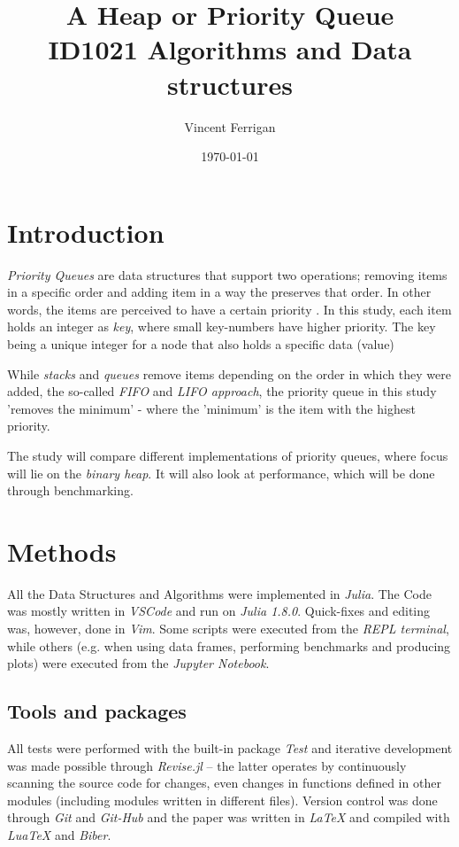\documentclass[a4paper, 11pt]{article}
\title{A Heap or Priority Queue\\ \small{ID1021 Algorithms and Data structures}} %
\author{Vincent Ferrigan}
\date{\today}
\begin{document}
    \maketitle
    \section*{Introduction}
    \emph{Priority Queues} are data structures that support two operations; removing items 
    in a specific order and adding item in a way the preserves that order. 
    In other words, 
    the items are perceived to have a certain priority \parencite{Segeqick2011Alg4th}.
    In this study, each item holds an integer as \emph{key}, 
    where small key-numbers have higher priority. 
    The key being a unique integer for a node that also holds a specific data (value)
    
    While \emph{stacks} and \emph{queues} remove items depending on the order in
    which they were added, the 
    so-called \emph{FIFO} and \emph{LIFO approach}, 
    the priority queue in this study 'removes the minimum' - where the 'minimum' is the
    item with the highest priority. 

    The study will compare different implementations of priority queues, 
    where focus will lie on the \emph{binary heap}. It will also look at performance,
    which will be done through benchmarking. 

    \section*{Methods}
    \label{sec:methods}
    All the Data Structures and Algorithms were implemented in \emph{Julia}.
    The Code was mostly written in \emph{VSCode} and run on \emph{Julia 1.8.0}.
    Quick-fixes and editing was, however, done in \emph{Vim}. 
    Some scripts were executed from the \emph{REPL terminal},  while others (e.g.
    when using data frames, performing benchmarks and producing plots) 
    were executed from the \emph{Jupyter Notebook}. 
    
    \subsection*{Tools and packages}
    All tests were performed with the built-in package \emph{Test} and 
    iterative development was made possible through 
    \emph{Revise.jl} -- the latter operates by continuously
    scanning the source code for changes, even changes in functions defined in
    other modules (including modules written in different files). 
    Version control was done through \emph{Git} and \emph{Git-Hub} and the paper
    was written in \emph{\LaTeX} and compiled with \emph{LuaTeX} and \emph{Biber}.
    
\end{document}
